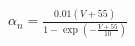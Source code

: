 \documentclass[preview]{standalone}
\begin{document}
\begin{align*}
\alpha_n = \frac{0.01 (V + 55)}{1 - \exp \left( -\frac{V + 55}{10} \right)}
\end{align*}
\end{document}
